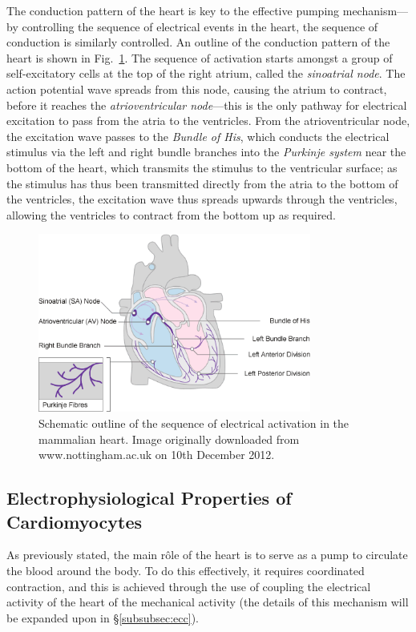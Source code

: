 \documentclass[../thesis-main.tex]{subfiles}
\begin{document}
 The conduction pattern of the heart is key to the effective pumping mechanism---by controlling the sequence of electrical events in the heart, the sequence of conduction is similarly controlled. An outline of the conduction pattern of the heart is shown in Fig.~\ref{fig:conduction-pattern}. The sequence of activation starts amongst a group of self-excitatory cells at the top of the right atrium, called the \emph{sinoatrial node}. The action potential wave spreads from this node, causing the atrium to contract, before it reaches the \emph{atrioventricular node}---this is the only pathway for electrical excitation to pass from the atria to the ventricles. From the atrioventricular node, the excitation wave passes to the \emph{Bundle of His}, which conducts the electrical stimulus via the left and right bundle branches into the \emph{Purkinje system} near the bottom of the heart, which transmits the stimulus to the ventricular surface; as the stimulus has thus been transmitted directly from the atria to the bottom of the ventricles, the excitation wave thus spreads upwards through the ventricles, allowing the ventricles to contract from the bottom up as required.
 \begin{figure}
  \centering
  \includegraphics[width=0.8\textwidth]{cardiac_conduction}
  \caption[Pattern of electrical activation in the heart]{Schematic outline of the sequence of electrical activation in the mammalian heart. Image originally downloaded from www.nottingham.ac.uk on 10th December 2012.}
  \label{fig:conduction-pattern}
 \end{figure}
 
 \subsection{Electrophysiological Properties of Cardiomyocytes}
 \label{subsec:electro-prop}
 As previously stated, the main r\^ole of the heart is to serve as a pump to circulate the blood around the body. To do this effectively, it requires coordinated contraction, and this is achieved through the use of coupling the electrical activity of the heart of the mechanical activity (the details of this mechanism will be expanded upon in \S\ref{subsubsec:ecc}).
 
\end{document}
